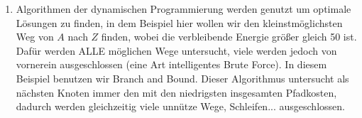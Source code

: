 \documentclass[a4paper,10pt]{article}
\begin{document}
\begin{enumerate}[~~a)]
\begin{enumerate}[1.]
\begin{center}
			\end{center}
	\end{enumerate}

	\item
	Algorithmen der dynamischen Programmierung werden genutzt um optimale Lösungen zu finden, in dem Beispiel hier wollen wir den kleinstmöglichsten Weg von $A$ nach $Z$ finden, wobei die verbleibende Energie größer gleich 50 ist. Dafür werden ALLE möglichen Wege untersucht, viele werden jedoch von vornerein ausgeschlossen (eine Art intelligentes Brute Force). In diesem Beispiel benutzen wir Branch and Bound. Dieser Algorithmus untersucht als nächsten Knoten immer den mit den niedrigsten insgesamten Pfadkosten, dadurch werden gleichzeitig viele unnütze Wege, Schleifen... ausgeschlossen. 
\end{enumerate}
\end{document}
